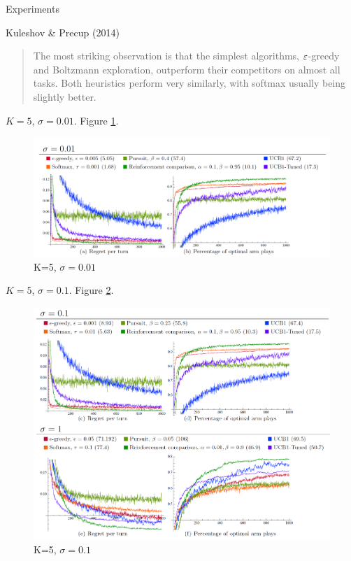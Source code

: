 \documentclass[english]{article}
\begin{document}
\item {Experiments}
\bitem
\item Kuleshov \& Precup (2014)
\begin{quote}
The most striking observation is that the simplest algorithms, $\varepsilon$-greedy and Boltzmann exploration, outperform their competitors on almost all tasks. Both heuristics perform very similarly, with softmax usually being slightly better. 
\end{quote}
\eitem



\item {$K=5$, $\sigma=0.01$}. Figure \ref{K=5.sigma=0.01}.
\begin{figure}[h!]
\begin{center}
\includegraphics[width=0.7\paperwidth]{k=5.sigma=0.01}
    \caption{K=5, $\sigma=0.01$}
    \label{K=5.sigma=0.01}
\end{center}
\end{figure}



\item {$K=5$, $\sigma=0.1$}. Figure \ref{K=5.sigma=0.1}.
\begin{figure}[h!]
\begin{center}
\includegraphics[width=0.7\paperwidth]{k=5}
    \caption{K=5, $\sigma=0.1$}
    \label{K=5.sigma=0.1}
\end{center}
\end{figure}
\end{document}
